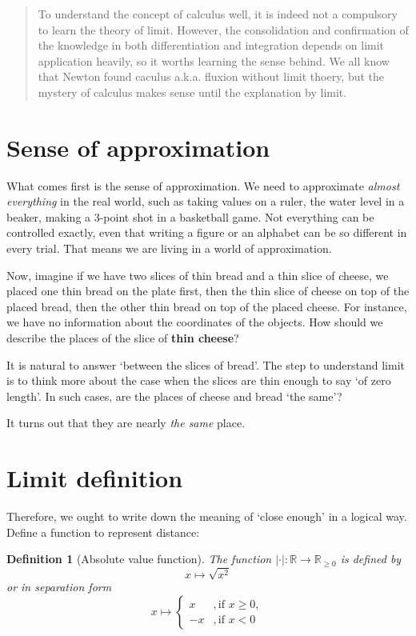 \documentclass[12pt]{article}
\newtheorem{definition}{Definition}[section]
\begin{document}
    \begin{abstract}
        To understand the concept of calculus well, it is indeed not a compulsory to learn the theory of limit. However, the consolidation and confirmation of the knowledge in both differentiation and integration depends on limit application heavily, so it worths learning the sense behind. We all know that Newton found caculus a.k.a. fluxion without limit thoery, but the mystery of calculus makes sense until the explanation by limit.
    \end{abstract}

    \section{Sense of approximation}

    What comes first is the sense of approximation. We need to approximate \textit{almost everything} in the real world, such as taking values on a ruler, the water level in a beaker, making a 3-point shot in a basketball game. Not everything can be controlled exactly, even that writing a figure or an alphabet can be so different in every trial. That means we are living in a world of approximation.

    Now, imagine if we have two slices of thin bread and a thin slice of cheese, we placed one thin bread on the plate first, then the thin slice of cheese on top of the placed bread, then the other thin bread on top of the placed cheese. For instance, we have no information about the coordinates of the objects. How should we describe the places of the slice of \textbf{thin cheese}?

    It is natural to answer `between the slices of bread'. The step to understand limit is to think more about the case when the slices are thin enough to say `of zero length'. In such cases, are the places of cheese and bread `the same'?

    It turns out that they are nearly \textit{the same} place.

    \section{Limit definition}

    Therefore, we ought to write down the meaning of `close enough' in a logical way. Define a function to represent distance:

    \begin{definition}[Absolute value function]
        The function $|\cdot|:\mathbb{R}\to\mathbb{R}_{\geq 0}$ is defined by \[x\mapsto \sqrt{x^2}\] or in separation form \[x\mapsto \begin{cases}
            x&,\textrm{if }x\geq 0,\\
            -x&,\textrm{if }x< 0
        \end{cases}\]
    \end{definition}
\end{document}
